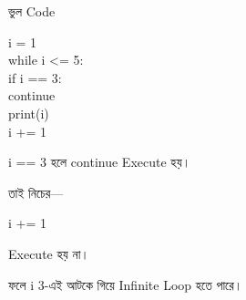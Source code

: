 \begin{codeoutputbox}{ভুল Code}

\noindent
\begin{minipage}[t]{0.54\linewidth}
\codeheading

\begin{english}
\ttfamily
i = 1\\
while i <= 5:\\
\hspace*{4mm}if i == 3:\\
\hspace*{8mm}continue\\
\hspace*{4mm}print(i)\\
\hspace*{4mm}i += 1
\end{english}

\end{minipage}
\hfill
\begin{minipage}[t]{0.42\linewidth}
\outputheading

\textenglish{\ttfamily i == 3}
হলে
\textenglish{\ttfamily continue}
Execute হয়।

তাই নিচের—

\begin{center}
\textenglish{\ttfamily i += 1}
\end{center}

Execute হয় না।

ফলে
\textenglish{\ttfamily i}
3-এই আটকে গিয়ে Infinite Loop হতে পারে।

\end{minipage}

\end{codeoutputbox}

